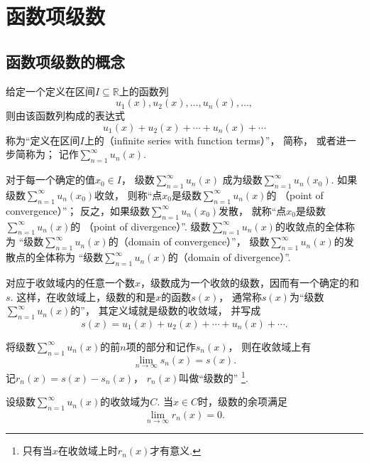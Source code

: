 \section{函数项级数}
\subsection{函数项级数的概念}
\begin{definition}\label{definition:无穷级数.实函数项级数的概念}
给定一个定义在区间\(I \subseteq \mathbb{R}\)上的函数列\[
	u_1(x),u_2(x),\dotsc,u_n(x),\dotsc,
\]
则由该函数列构成的表达式\[
	u_1(x)+u_2(x)+\dotsb+u_n(x)+\dotsb
\]
称为“定义在区间\(I\)上的（infinite series with function terms）”，
简称，
或者进一步简称为；
记作\(\sum\limits_{n=1}^\infty u_n(x)\).

对于每一个确定的值\(x_0 \in I\)，
级数\(\sum\limits_{n=1}^\infty u_n(x)\)
成为级数\(\sum\limits_{n=1}^\infty u_n(x_0)\).
如果级数\(\sum\limits_{n=1}^\infty u_n(x_0)\)收敛，
则称“点\(x_0\)是级数\(\sum\limits_{n=1}^\infty u_n(x)\)的
（point of convergence）”；
反之，如果级数\(\sum\limits_{n=1}^\infty u_n(x_0)\)发散，
就称“点\(x_0\)是级数\(\sum\limits_{n=1}^\infty u_n(x)\)的
（point of divergence）”.
级数\(\sum\limits_{n=1}^\infty u_n(x)\)的收敛点的全体称为
“级数\(\sum\limits_{n=1}^\infty u_n(x)\)的（domain of convergence）”，
级数\(\sum\limits_{n=1}^\infty u_n(x)\)的发散点的全体称为
“级数\(\sum\limits_{n=1}^\infty u_n(x)\)的（domain of divergence）”.

对应于收敛域内的任意一个数\(x\)，级数成为一个收敛的级数，因而有一个确定的和\(s\).
这样，在收敛域上，级数的和是\(x\)的函数\(s(x)\)，
通常称\(s(x)\)为“级数\(\sum\limits_{n=1}^\infty u_n(x)\)的”，
其定义域就是级数的收敛域，
并写成\[
	s(x) = u_1(x)+u_2(x)+\dotsb+u_n(x)+\dotsb.
\]

将级数\(\sum\limits_{n=1}^\infty u_n(x)\)的前\(n\)项的部分和记作\(s_n(x)\)，
则在收敛域上有\[
	\lim\limits_{n\to\infty} s_n(x) = s(x).
\]
记\(r_n(x) = s(x)-s_n(x)\)，
\(r_n(x)\)叫做“级数的”%
\footnote{只有当\(x\)在收敛域上时\(r_n(x)\)才有意义.}.
\end{definition}

\begin{property}
设级数\(\sum\limits_{n=1}^\infty u_n(x)\)的收敛域为\(C\).
当\(x \in C\)时，级数的余项满足\[
	\lim\limits_{n\to\infty} r_n(x) = 0.
\]
\end{property}
